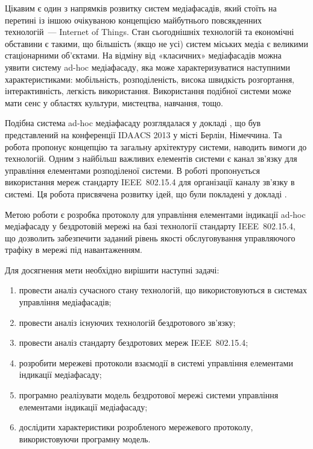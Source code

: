 \documentclass[a4paper,ukrainian,utf8,nocolumnsxix,floatsection,equationsection]{eskdtext}
\newcommand{\iee}[0]{IEEE~802.15.4\xspace}
\begin{document}
Цікавим є один з напрямків розвитку систем медіафасадів, який стоїть на перетині із іншою очікуваною концепцією майбутнього повсякденних технологій~--- Internet of Things. Стан сьогоднішніх технологій та економічні обставини є такими, що більшість (якщо не усі) систем міських медіа є великими стаціонарними об'єктами. На відміну від «класичних» медіафасадів можна уявити систему ad-hoc медіафасаду, яка може характеризуватися наступними характеристиками: мобільність, розподіленість, висока швидкість розгортання, інтерактивність, легкість використання. Використання подібної системи може мати сенс у областях культури, мистецтва, навчання, тощо.

Подібна система ad-hoc медіафасаду розглядалася у докладі \cite{idaacs:2013:adhoc:media:facade}, що був представлений на конференції IDAACS 2013 у місті Берлін, Німеччина. Та робота пропонує концепцію та загальну архітектуру системи, наводить вимоги до технологій. Одним з найбільш важливих елементів системи є канал зв'язку для управління елементами розподіленої системи. В роботі пропонується використання мереж стандарту \iee для організації каналу зв'язку в системі. Ця робота присвячена розвитку ідей, що були покладені у докладі \cite{idaacs:2013:adhoc:media:facade}.

Метою роботи є розробка протоколу для управління елементами індикації ad-hoc медіафасаду у бездротовій мережі на базі технології стандарту \iee, що дозволить забезпечити заданий рівень якості обслуговування управляючого трафіку в мережі під навантаженням.

Для досягнення мети необхідно вирішити наступні задачі:
\begin{enumerate}
	\item провести аналіз сучасного стану технологій, що використовуються в системах управління медіафасадів;
	\item провести аналіз існуючих технологій бездротового зв'язку;
	\item провести аналіз стандарту бездротових мереж \iee;
	\item розробити мережеві протоколи взаємодії в системі управління елементами індикації медіафасаду;
	\item\label{task:create_model} програмно реалізувати модель бездротової мережі системи управління елементами індикації медіафасаду;
	\item\label{task:do_simulation} дослідити характеристики розробленого мережевого протоколу, використовуючи програмну модель.
\end{enumerate}
\end{document}
